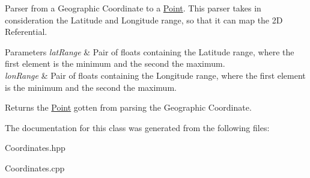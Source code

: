 Parser from a Geographic Coordinate to a \hyperlink{class_point}{Point}. This parser takes in consideration the Latitude and Longitude range, so that it can map the 2D Referential.


\begin{DoxyParams}{Parameters}
{\em lat\+Range} & Pair of floats containing the Latitude range, where the first element is the minimum and the second the maximum. \\
\hline
{\em lon\+Range} & Pair of floats containing the Longitude range, where the first element is the minimum and the second the maximum.\\
\hline
\end{DoxyParams}
\begin{DoxyReturn}{Returns}
the \hyperlink{class_point}{Point} gotten from parsing the Geographic Coordinate. 
\end{DoxyReturn}


The documentation for this class was generated from the following files\+:\begin{DoxyCompactItemize}
\item 
Coordinates.\+hpp\item 
Coordinates.\+cpp\end{DoxyCompactItemize}
